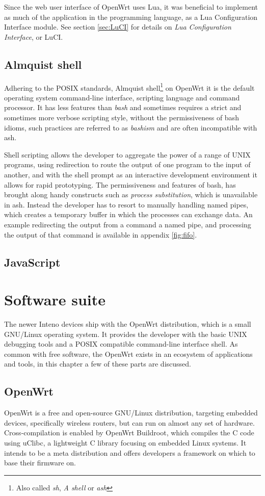 \documentclass[a4paper,11pt,makeidx]{kth-bcs}
\begin{document}
Since the web user interface of OpenWrt uses Lua, it was beneficial to implement as much of the application in the programming language, as a Lua Configuration Interface module.
See section \ref{sec:LuCI} for details on \emph{Lua Configuration Interface}, or LuCI.

\subsection{Almquist shell}
Adhering to the POSIX standards, Almquist shell\footnote{Also called \emph{sh}, \emph{A shell} or \emph{ash}} on OpenWrt it is the default operating system command-line interface, scripting language and command processor.
It has less features than \emph{bash} and sometimes requires a strict and sometimes more verbose scripting style, without the permissiveness of bash idioms, such practices are referred to as \emph{bashism} and are often incompatible with ash.

Shell scripting allows the developer to aggregate the power of a range of UNIX programs, using redirection to route the output of one program to the input of another, and with the shell prompt as an interactive development environment it allows for rapid prototyping.
The permissiveness and features of bash, has brought along handy constructs such as \emph{process substitution}, which is unavailable in ash.
Instead the developer has to resort to manually handling named pipes, which creates a temporary buffer in which the processes can exchange data.
An example redirecting the output from a command a named pipe, and processing the output of that command is available in appendix \ref{fig:fifo}.

\subsection{JavaScript}

\section{Software suite}

The newer Inteno devices ship with the OpenWrt distribution, which is a small GNU/Linux operating system.
It provides the developer with the basic UNIX debugging tools and a POSIX compatible command-line interface shell.
As common with free software, the OpenWrt exists in an ecosystem of applications and tools, in this chapter a few of these parts are discussed.

\subsection{OpenWrt}
OpenWrt is a free and open-source GNU/Linux distribution, targeting embedded devices, specifically wireless routers, but can run on almost any set of hardware.
Cross-compilation is enabled by OpenWrt Buildroot, which compiles the C code using uClibc, a lightweight C library focusing on embedded Linux systems. 
It intends to be a meta distribution and offers developers a framework on which to base their firmware on.
\end{document}
